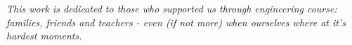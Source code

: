 \begin{dedication}
   \vspace*{\fill}
   \centering
   \noindent
   \textit{ This work is dedicated to those who supported us through engineering
   course: families, friends and teachers - even (if not more) when ourselves
   where at it's hardest moments.  } \vspace*{\fill}
\end{dedication}
